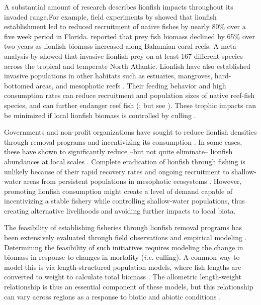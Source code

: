 \documentclass[]{article}
\theoremstyle{definition}
\theoremstyle{definition}
\theoremstyle{definition}
\theoremstyle{remark}
\begin{document}
A substantial amount of research describes lionfish impacts throughout
its invaded range.For example, field experiments by \citet{albins_2008}
showed that lionfish establishment led to reduced recruitment of native
fishes by nearly 80\% over a five week period in Florida.
\citet{green_2012} reported that prey fish biomass declined by 65\% over
two years as lionfish biomass increased along Bahamian coral reefs. A
meta-analysis by \citet{peake_2018} showed that invasive lionfish prey
on at least 167 different species across the tropical and temperate
North Atlantic. Lionfish have also established invasive populations in
other habitats such as estuaries, mangroves, hard-bottomed areas, and
mesophotic reefs
\citep{barbour_2010,jud_2011,muoz_2011,claydon_2012,andradibrown_2017}.
Their feeding behavior and high consumption rates can reduce recruitment
and population sizes of native reef-fish species, and can further
endanger reef fish (\citet{green_2012,rocha_2015}; but see
\citet{hackerott_2017}). These trophic impacts can be minimized if local
lionfish biomass is controlled by culling \citep{ariasgonzalez_2011}.

Governments and non-profit organizations have sought to reduce lionfish
densities through removal programs and incentivizing its consumption
\citep{chin_2016}. In some cases, these have shown to significantly
reduce --but not quite eliminate-- lionfish abundances at local scales
\citep{deleon_2013,sandel_2015}. Complete eradication of lionfish
through fishing is unlikely because of their rapid recovery rates and
ongoing recruitment to shallow-water areas from persistent populations
in mesophotic ecosystems \citep{barbour_2011,andradibrown_2017}.
However, promoting lionfish consumption might create a level of demand
capable of incentivizing a stable fishery while controlling
shallow-water populations, thus creating alternative livelihoods and
avoiding further impacts to local biota.

The feasibility of establishing fisheries through lionfish removal
programs has been extensively evaluated through field observations and
empirical modeling
\citep{barbour_2011,morris_2011,deleon_2013,johnston_2015,sandel_2015,usseglio_2017}.
Determining the feasibility of such initiatives requires modeling the
change in biomass in response to changes in mortality (\emph{i.e.}
culling). A common way to model this is via length-structured population
models, where fish lengths are converted to weight to calculate total
biomass \citep{barbour_2011,cote_2014,andradibrown_2017}. The allometric
length-weight relationship is thus an essential component of these
models, but this relationship can vary across regions as a response to
biotic and abiotic conditions \citep{johnson_2016}.
\end{document}
